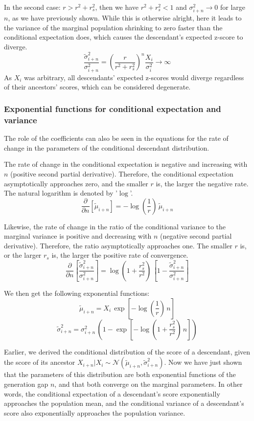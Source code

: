 \documentclass[a4paper,11pt]{article} %
\begin{document}
In the second case: $r > r^2 + r_s^2$, then we have $r^2 + r_s^2 < 1$ and $\sigma_{i+n}^2 \rightarrow 0$ for large $n$, as we have previously shown. While this is otherwise alright, here it leads to the variance of the marginal population shrinking to zero faster than the conditional expectation does, which causes the descendant's expected z-score to diverge.
$$\frac{\tilde{\sigma}_{i+n}^2}{\sigma_{i+n}^2} = (\frac{r}{r^2+r_s^2})^n \frac{X_i}{\sigma_i^2} \rightarrow \infty$$
As $X_i$ was arbitrary, all descendants' expected z-scores would diverge regardless of their ancestors' scores, which can be considered degenerate. 


\subsubsection*{Exponential functions for conditional expectation and variance}

The role of the coefficients can also be seen in the equations for the rate of change in the parameters of the conditional descendant distribution.

The rate of change in the conditional expectation is negative and increasing with $n$ (positive second partial derivative). Therefore, the conditional expectation asymptotically approaches zero, and the smaller $r$ is, the larger the negative rate. The natural logarithm is denoted by '$\log$'.
$$\frac{\partial }{\partial n}[\tilde{\mu}_{i+n}] = -\log(\frac{1}{r}) \, \tilde{\mu}_{i+n}$$


Likewise, the rate of change in the ratio of the conditional variance to the marginal variance is positive and decreasing with $n$ (negative second partial derivative). Therefore, the ratio asymptotically approaches one. The smaller $r$ is, or the larger $r_s$ is, the larger the positive rate of convergence.
$$\frac{\partial }{\partial n}[\frac{\tilde{\sigma}_{i+n}^2}{\sigma_{i+n}^2}] = \log(1+\frac{r_s^2}{r^2}) \, [1 - \frac{\tilde{\sigma}_{i+n}^2}{\sigma_{i+n}^2}]$$

We then get the following exponential functions:
$$\tilde{\mu}_{i+n} = X_i \, \exp[-\log(\frac{1}{r}) \, n]$$
$$\tilde{\sigma}_{i+n}^2 = \sigma_{i+n}^2 \, (1 - \exp[-\log(1+\frac{r_s^2}{r^2}) \, n])$$

Earlier, we derived the conditional distribution of the score of a descendant, given the score of its ancestor $X_{i+n}|X_i \sim \mathcal{N}( \tilde{\mu}_{i+n}, \tilde{\sigma}_{i+n}^2)$. Now we have just shown that the parameters of this distribution are both exponential functions of the generation gap $n$, and that both converge on the marginal parameters. In other words, the conditional expectation of a descendant's score exponentially approaches the population mean, and the conditional variance of a descendant's score also exponentially approaches the population variance. 
\end{document}
